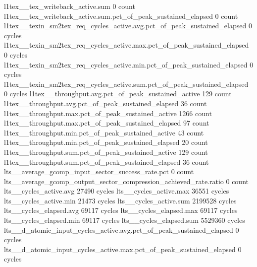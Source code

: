 l1tex__tex_writeback_active.sum                                                                0 count
l1tex__tex_writeback_active.sum.pct_of_peak_sustained_elapsed                                  0 count
l1tex__texin_sm2tex_req_cycles_active.avg.pct_of_peak_sustained_elapsed                        0 cycles
l1tex__texin_sm2tex_req_cycles_active.max.pct_of_peak_sustained_elapsed                        0 cycles
l1tex__texin_sm2tex_req_cycles_active.min.pct_of_peak_sustained_elapsed                        0 cycles
l1tex__texin_sm2tex_req_cycles_active.sum.pct_of_peak_sustained_elapsed                        0 cycles
l1tex__throughput.avg.pct_of_peak_sustained_active                                           129 count
l1tex__throughput.avg.pct_of_peak_sustained_elapsed                                           36 count
l1tex__throughput.max.pct_of_peak_sustained_active                                          1266 count
l1tex__throughput.max.pct_of_peak_sustained_elapsed                                           97 count
l1tex__throughput.min.pct_of_peak_sustained_active                                            43 count
l1tex__throughput.min.pct_of_peak_sustained_elapsed                                           20 count
l1tex__throughput.sum.pct_of_peak_sustained_active                                           129 count
l1tex__throughput.sum.pct_of_peak_sustained_elapsed                                           36 count
lts__average_gcomp_input_sector_success_rate.pct                                               0 count
lts__average_gcomp_output_sector_compression_achieved_rate.ratio                               0 count
lts__cycles_active.avg                                                                     27490 cycles
lts__cycles_active.max                                                                     36551 cycles
lts__cycles_active.min                                                                     21473 cycles
lts__cycles_active.sum                                                                   2199528 cycles
lts__cycles_elapsed.avg                                                                    69117 cycles
lts__cycles_elapsed.max                                                                    69117 cycles
lts__cycles_elapsed.min                                                                    69117 cycles
lts__cycles_elapsed.sum                                                                  5529360 cycles
lts__d_atomic_input_cycles_active.avg.pct_of_peak_sustained_elapsed                            0 cycles
lts__d_atomic_input_cycles_active.max.pct_of_peak_sustained_elapsed                            0 cycles
